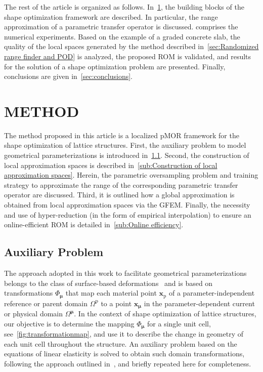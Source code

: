 \documentclass[a4paper]{eccomas_paper-2024}
\begin{document}
The rest of the article is organized as follows.
In~\cref{sec:method}, the building blocks of the shape optimization framework are described.
In particular, the range approximation of a parametric transfer operator is discussed.
 comprises the numerical experiments.
Based on the example of a graded concrete slab, the quality of the local spaces generated by the method described in~\cref{sec:Randomized range finder and POD} is analyzed, the proposed ROM is validated, and results for the solution of a shape optimization problem are presented.
Finally, conclusions are given in~\cref{sec:conclusions}.


\section{METHOD}%
\label{sec:method}
The method proposed in this article is a localized pMOR framework for the shape optimization of lattice structures.
First, the auxiliary problem to model geometrical parameterizations is introduced in~\cref{sub:Auxiliary Problem}.
Second, the construction of local approximation spaces is described in~\cref{sub:Construction of local approximation spaces}.
Herein, the parametric oversampling problem and training strategy to approximate the range of the corresponding parametric transfer operator are discussed.
Third, it is outlined how a global approximation is obtained from local approximation spaces via the GFEM.
Finally, the necessity and use of hyper-reduction (in the form of empirical interpolation) to ensure an online-efficient ROM is detailed in~\cref{sub:Online efficiency}.

\subsection{Auxiliary Problem} %
\label{sub:Auxiliary Problem}
The approach adopted in this work to facilitate geometrical parameterizations belongs to the class of surface-based deformations~\cite{Botsch2010Polygon} and is based on transformations $\Phi_{\bm\mu}$ that map each material point $\bm{x}_{\mathrm{p}}$ of a parameter-independent reference or parent domain $\varOmega^{\mathrm{p}}$ to a point $\bm{x}_{\bm\mu}$ in the parameter-dependent current or physical domain $\varOmega^{\bm\mu}$.
In the context of shape optimization of lattice structures, our objective is to determine the mapping $\Phi_{\bm\mu}$ for a single unit cell, see~\cref{fig:transformationmap}, and use it to describe the change in geometry of each unit cell throughout the structure.
An auxiliary problem based on the equations of linear elasticity is solved to obtain such domain transformations, following the approach outlined in~\cite{Guo2022Learning}, and briefly repeated here for completeness.
\end{document}

